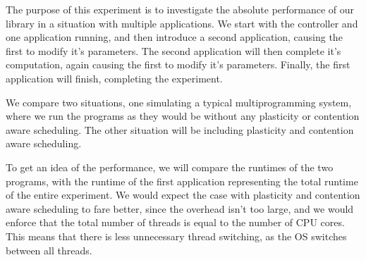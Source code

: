 The purpose of this experiment is to investigate the absolute performance of our library in a situation with multiple applications. We start with the controller and one application running, and then introduce a second application, causing the first to modify it's parameters. The second application will then complete it's computation, again causing the first to modify it's parameters. Finally, the first application will finish, completing the experiment. 

We compare two situations, one simulating a typical multiprogramming system, where we run the programs as they would be without any plasticity or contention aware scheduling. The other situation will be including plasticity and contention aware scheduling.

To get an idea of the performance, we will compare the runtimes of the two programs, with the runtime of the first application representing the total runtime of the entire experiment. We would expect the case with plasticity and contention aware scheduling to fare better, since the overhead isn't too large, and we would enforce that the total number of threads is equal to the number of CPU cores. This means that there is less unnecessary thread switching, as the OS switches between all threads.

